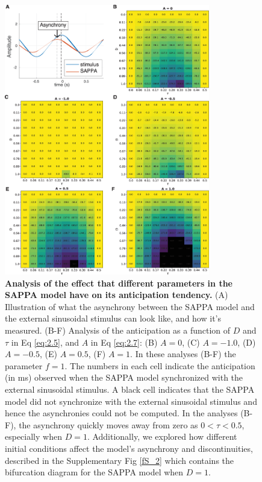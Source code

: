 \documentclass{report}
\begin{document}
\begin{figure}
    \centering
    \includegraphics[width=0.8\textwidth]{figures/fig2_6.png}
    \caption[Analysis of the effect that different parameters in the SAPPA model have on its anticipation tendency]{\textbf{Analysis of the effect that different parameters in the SAPPA model have on its anticipation tendency.} (A) Illustration of what the asynchrony between the SAPPA model and the external sinusoidal stimulus can look like, and how it’s measured. (B-F) Analysis of the anticipation as a function of $D$ and $\tau$ in Eq \eqref{eq:2.5}, and $A$ in Eq \eqref{eq:2.7}: (B) $A = 0$, (C) $A = -1.0$, (D) $A = -0.5$, (E) $A = 0.5$, (F) $A = 1$. In these analyses (B-F) the parameter $f = 1$. The numbers in each cell indicate the anticipation (in ms) observed when the SAPPA model synchronized with the external sinusoidal stimulus. A black cell indicates that the SAPPA model did not synchronize with the external sinusoidal stimulus and hence the asynchronies could not be computed. In the analyses (B-F), the asynchrony quickly moves away from zero as $0 < \tau < 0.5$, especially when $D = 1$. Additionally, we explored how different initial conditions affect the model’s asynchrony and discontinuities, described in the Supplementary Fig \ref{fS_2} which contains the bifurcation diagram for the SAPPA model when $D = 1$.} 
    \label{f2_6}
\end{figure}
\end{document}
